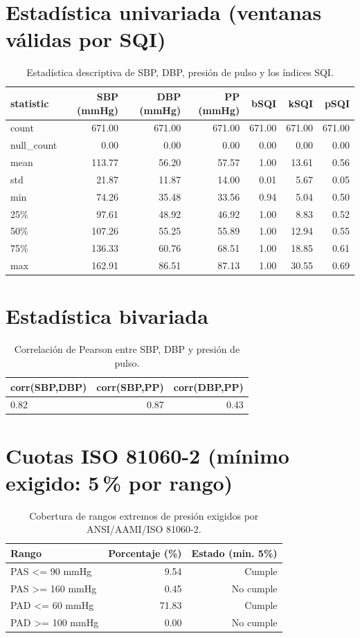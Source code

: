 \documentclass[11pt]{article}
\begin{document}
\section{Estadística univariada (ventanas válidas por SQI)}
\begin{table}[H]
\centering
\begin{tabular}{lrrrrrr}
\toprule
statistic & SBP (mmHg) & DBP (mmHg) & PP (mmHg) & bSQI & kSQI & pSQI \\
\midrule
count & 671.00 & 671.00 & 671.00 & 671.00 & 671.00 & 671.00 \\
null\_count & 0.00 & 0.00 & 0.00 & 0.00 & 0.00 & 0.00 \\
mean & 113.77 & 56.20 & 57.57 & 1.00 & 13.61 & 0.56 \\
std & 21.87 & 11.87 & 14.00 & 0.01 & 5.67 & 0.05 \\
min & 74.26 & 35.48 & 33.56 & 0.94 & 5.04 & 0.50 \\
25\% & 97.61 & 48.92 & 46.92 & 1.00 & 8.83 & 0.52 \\
50\% & 107.26 & 55.25 & 55.89 & 1.00 & 12.94 & 0.55 \\
75\% & 136.33 & 60.76 & 68.51 & 1.00 & 18.85 & 0.61 \\
max & 162.91 & 86.51 & 87.13 & 1.00 & 30.55 & 0.69 \\
\bottomrule
\end{tabular}
\caption{Estadística descriptiva de SBP, DBP, presión de pulso y los índices SQI.}
\end{table}

\section{Estadística bivariada}
\begin{table}[H]
\centering
\begin{tabular}{lrr}
\toprule
corr(SBP,DBP) & corr(SBP,PP) & corr(DBP,PP) \\
\midrule
0.82 & 0.87 & 0.43 \\
\bottomrule
\end{tabular}
\caption{Correlación de Pearson entre SBP, DBP y presión de pulso.}
\end{table}

\section{Cuotas ISO 81060-2 (mínimo exigido: 5\,\% por rango)}
\begin{table}[H]
\centering
\begin{tabular}{lrr}
\toprule
Rango & Porcentaje (\%) & Estado (min. 5\%) \\
\midrule
PAS <= 90 mmHg & 9.54 & Cumple \\
PAS >= 160 mmHg & 0.45 & No cumple \\
PAD <= 60 mmHg & 71.83 & Cumple \\
PAD >= 100 mmHg & 0.00 & No cumple \\
\bottomrule
\end{tabular}
\caption{Cobertura de rangos extremos de presión exigidos por ANSI/AAMI/ISO 81060-2.}
\end{table}
\end{document}
